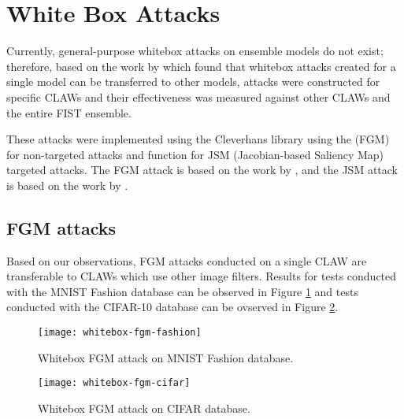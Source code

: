 \section{White Box Attacks} \label{s:whiteboxattacks}
	Currently, general-purpose whitebox attacks on ensemble models do not exist; therefore, based on the work by \citeauthor{liu2016} \cite{liu2016} which found that whitebox attacks created for a single model can be transferred to other models, attacks were constructed for specific CLAWs and their effectiveness was measured against other CLAWs and the entire FIST ensemble.

	These attacks were implemented using the Cleverhans library \cite{papernot2018cleverhans} using the  (FGM) for non-targeted attacks and  function for JSM (Jacobian-based Saliency Map) targeted attacks. The FGM attack is based on the work by \citeauthor{goodfellow2015} \cite{goodfellow2015}, and the JSM attack is based on the work by \citeauthor{papernot2018cleverhans} \cite{papernot2018cleverhans}.

	\subsection{FGM attacks}
		Based on our observations, FGM attacks conducted on a single CLAW are transferable to CLAWs which use other image filters. Results for tests conducted with the MNIST Fashion database \cite{zalandoresearchFashionMNIST} can be observed in Figure \ref{f:whitebox:fgm:fashion} and tests conducted with the CIFAR-10 database \cite{krizhevsky2009} can be ovserved in Figure \ref{f:whitebox:fgm:cifar}.
		\begin{figure}
			\texttt{[image: whitebox-fgm-fashion]}
			\caption{Whitebox FGM attack on MNIST Fashion database.}
			\label{f:whitebox:fgm:fashion}
		\end{figure}
		\begin{figure}
			\texttt{[image: whitebox-fgm-cifar]}
			\caption{Whitebox FGM attack on CIFAR database.}
			\label{f:whitebox:fgm:cifar}
		\end{figure}
